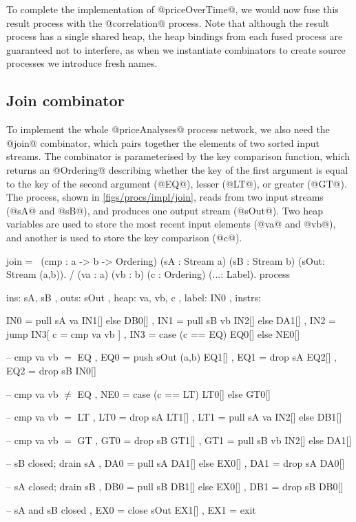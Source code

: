 To complete the implementation of @priceOverTime@, we would now fuse this result process with the @correlation@ process.
Note that although the result process has a single shared heap, the heap bindings from each fused process are guaranteed not to interfere, as when we instantiate combinators to create source processes we introduce fresh names. 


\subsection{Join combinator}

To implement the whole @priceAnalyses@ process network, we also need the @join@ combinator, which pairs together the elements of two sorted input streams.
The combinator is parameterised by the key comparison function, which returns an @Ordering@ describing whether the key of the first argument is equal to the key of the second argument (@EQ@), lesser (@LT@), or greater (@GT@).
The process, shown in \cref{figs/procs/impl/join}, reads from two input streams (@sA@ and @sB@), and produces one output stream (@sOut@).
Two heap variables are used to store the most recent input elements (@va@ and @vb@), and another is used to store the key comparison (@c@).

\begin{process}[float,caption=Process implementation of \Hs/join/,label=figs/procs/impl/join]
join 
  = \ (cmp : a -> b -> Ordering)
      (sA  : Stream a) (sB : Stream b)
      (sOut: Stream (a,b)). 
    / (va : a) (vb : b) (c : Ordering) (...: Label).
    process
     { ins:    { sA, sB }
     , outs:   { sOut }
     , heap:   { va, vb, c }
     , label:  IN0
     , instrs: { IN0 = pull  sA va      IN1[] else DB0[]
               , IN1 = pull  sB vb      IN2[] else DA1[]
               , IN2 = jump             IN3[ c = cmp va vb ]
               , IN3 = case  (c == EQ)  EQ0[] else NE0[]

               -- cmp va vb $=$ EQ
               , EQ0 = push  sOut (a,b) EQ1[]
               , EQ1 = drop  sA         EQ2[]
               , EQ2 = drop  sB         IN0[]

               -- cmp va vb $\not=$ EQ
               , NE0 = case  (c == LT)  LT0[] else GT0[]

               -- cmp va vb $=$ LT
               , LT0 = drop  sA         LT1[]
               , LT1 = pull  sA va      IN2[] else DB1[]

               -- cmp va vb $=$ GT
               , GT0 = drop  sB         GT1[]
               , GT1 = pull  sB vb      IN2[] else DA1[]

               -- sB closed; drain sA
               , DA0 = pull  sA         DA1[] else EX0[]
               , DA1 = drop  sA         DA0[]

               -- sA closed; drain sB
               , DB0 = pull  sB         DB1[] else EX0[]
               , DB1 = drop  sB         DB0[]

               -- sA and sB closed
               , EX0 = close sOut       EX1[]
               , EX1 = exit } }
\end{process}

